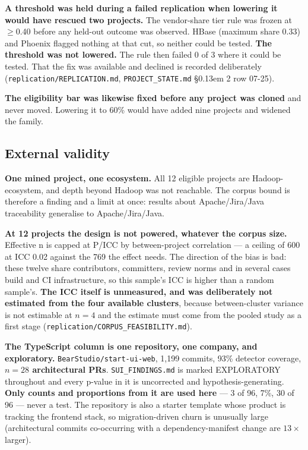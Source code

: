 \documentclass[11pt,a4paper]{article}
\begin{document}
\textbf{A threshold was held during a failed replication when lowering it would have rescued two projects.} The vendor-share tier rule was frozen at $\geq$0.40 before any held-out outcome was observed. HBase (maximum share 0.33) and Phoenix flagged nothing at that cut, so neither could be tested. \textbf{The threshold was not lowered.} The rule then failed 0 of 3 where it could be tested. That the fix was available and declined is recorded deliberately (\texttt{replication/\allowbreak{}REPLICATION.\allowbreak{}md}, \texttt{PROJECT\_\allowbreak{}STATE.\allowbreak{}md} \S\kern0.13em 2 row 07-25).

\textbf{The eligibility bar was likewise fixed before any project was cloned} and never moved. Lowering it to 60\% would have added nine projects and widened the family.

\subsection{External validity}
\label{sec:6.7}

\textbf{One mined project, one ecosystem.} All 12 eligible projects are Hadoop-ecosystem, and depth beyond Hadoop was not reachable. The corpus bound is therefore a finding and a limit at once: results about Apache/Jira/Java traceability generalise to Apache/Jira/Java.

\textbf{At 12 projects the design is not powered, whatever the corpus size.} Effective n is capped at P/ICC by between-project correlation --- a ceiling of 600 at ICC 0.02 against the 769 the effect needs. The direction of the bias is bad: these twelve share contributors, committers, review norms and in several cases build and CI infrastructure, so this sample's ICC is higher than a random sample's. \textbf{The ICC itself is unmeasured, and was deliberately not estimated from the four available clusters}, because between-cluster variance is not estimable at $n=4$ and the estimate must come from the pooled study as a first stage (\texttt{replication/\allowbreak{}CORPUS\_\allowbreak{}FEASIBILITY.\allowbreak{}md}).

\textbf{The TypeScript column is one repository, one company, and exploratory.} \texttt{BearStudio/\allowbreak{}start-\allowbreak{}ui-\allowbreak{}web}, 1,199 commits, 93\% detector coverage, \textbf{$n=28$ architectural PRs}. \texttt{SUI\_\allowbreak{}FINDINGS.\allowbreak{}md} is marked EXPLORATORY throughout and every p-value in it is uncorrected and hypothesis-generating. \textbf{Only counts and proportions from it are used here} --- 3 of 96, 7\%, 30 of 96 --- never a test. The repository is also a starter template whose product is tracking the frontend stack, so migration-driven churn is unusually large (architectural commits co-occurring with a dependency-manifest change are $13\times$ larger).
\end{document}
